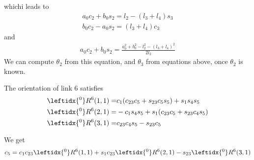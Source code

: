 \documentclass{article}
\begin{document}
whichi leads to
\begin{align}
	a_0c_2+b_0s_2=l_2-(l_3+l_4)s_3\\
	b_0c_2-a_0s_2 = (l_3+l_4)c_3
\end{align}
and
\begin{align}
	a_0c_2+b_0s_2 = \frac{a_0^2 + b_0^2 - l_2^2 - (l_3 + l_4)^2}{2l_2}
\end{align}
We can compute $\theta_2$ from this equation, and $\theta_3$ from equations above, once $\theta_2$ is known.

The orientation of link 6 satisfies
\begin{align}
	\leftidx{^0}R^6(1,1) = &c_1(c_{23}c_5 + s_{23}c_5s_5) + s_1s_4s_5\\
	\leftidx{^0}R^6(2,1) = &-c_1s_4s_5 + s_1(c_{23}c_5 + s_{23}c_4s_5)\\
	\leftidx{^0}R^6(3,1) = &c_{23}c_4s_5 - s_{23}c_5
\end{align}

We get
\begin{align}
	c_5 = c_1c_{23}\leftidx{^0}R^6(1,1) + s_1c_{23}\leftidx{^0}R^6(2,1)-s_{23}\leftidx{^0}R^6(3,1)
\end{align}
\end{document}

